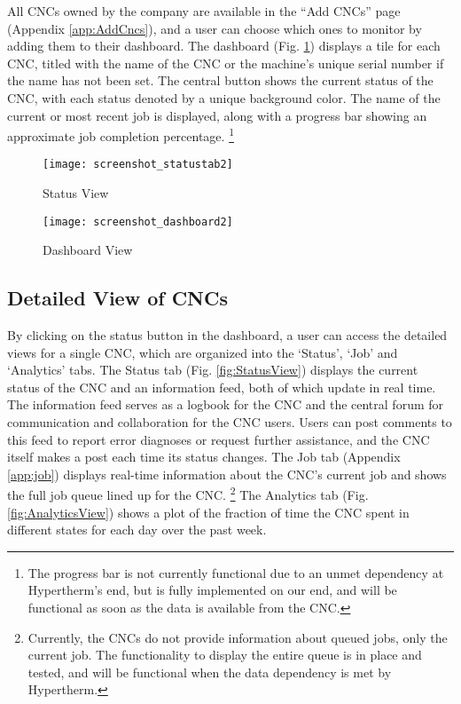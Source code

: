 \documentclass[12pt,letterpaper,titlepage]{article}
\begin{document}
All CNCs owned by the company are available in the ``Add CNCs'' page (Appendix \ref{app:AddCncs}), and a user can choose which ones to monitor by adding them to their dashboard. The dashboard (Fig. \ref{fig:DashboardView}) displays a tile for each CNC, titled with the name of the CNC or the machine's unique serial number if the name has not been set. The central button shows the current status of the CNC, with each status denoted by a unique background color. The name of the current or most recent job is displayed, along with a progress bar showing an approximate job completion percentage. \footnote{The progress bar is not currently functional due to an unmet dependency at Hypertherm's end, but is fully implemented on our end, and will be functional as soon as the data is available from the CNC.}

\begin{figure}[h]
\centering
\begin{minipage}{.5\textwidth}
  \centering
  \texttt{[image: screenshot\_statustab2]}
  \caption{Status View}
  \label{fig:StatusView}
\end{minipage}%
\begin{minipage}{.5\textwidth}
  \centering
  \texttt{[image: screenshot\_dashboard2]}
  \vspace{-30pt}
  \caption{Dashboard View}
  \label{fig:DashboardView}
\end{minipage}
\end{figure}

\subsection{Detailed View of CNCs} \label{sec:DetailedViewofCNCs}

By clicking on the status button in the dashboard, a user can access the detailed views for a single CNC, which are organized into the ‘Status’, ‘Job’ and ‘Analytics’ tabs.
The Status tab (Fig. \ref{fig:StatusView}) displays the current status of the CNC and an information feed, both of which update in real time. The information feed serves as a logbook for the CNC and the central forum for communication and collaboration for the CNC users. Users can post comments to this feed to report error diagnoses or request further assistance, and the CNC itself makes a post each time its status changes.
The Job tab (Appendix \ref{app:job}) displays real-time information about the CNC's current job and shows the full job queue lined up for the CNC. \footnote{Currently, the CNCs do not provide information about queued jobs, only the current job. The functionality to display the entire queue is in place and tested, and will be functional when the data dependency is met by Hypertherm.}
The Analytics tab (Fig. \ref{fig:AnalyticsView}) shows a plot of the fraction of time the CNC spent in different states for each day over the past week.
\end{document}
